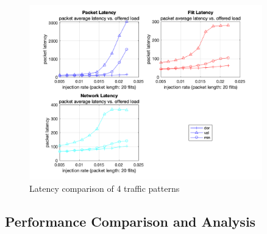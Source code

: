 \begin{figure}[H]
    \centering
    \includegraphics[width=0.9\textwidth]{Images/chap2/torus_uniform/torus_comparison.png}
    \caption{Latency comparison of 4 traffic patterns}
    \label{fig:com_torus_uniform}
\end{figure}

\subsection{Performance Comparison and Analysis}

